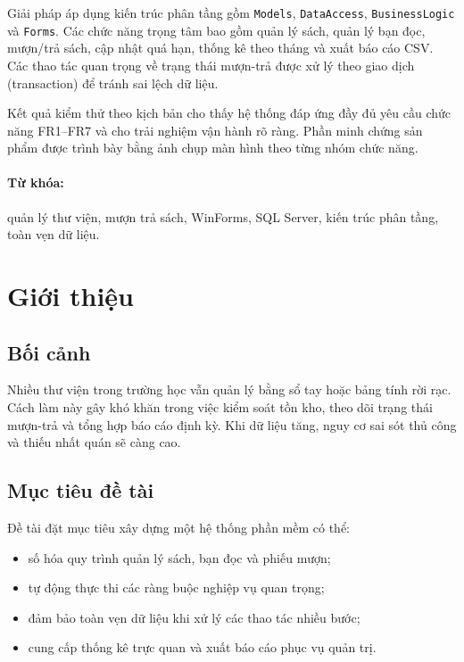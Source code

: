 \documentclass[12pt,a4paper]{article}
\begin{document}
Giải pháp áp dụng kiến trúc phân tầng gồm \texttt{Models}, \texttt{DataAccess}, \texttt{BusinessLogic} và \texttt{Forms}. Các chức năng trọng tâm bao gồm quản lý sách, quản lý bạn đọc, mượn/trả sách, cập nhật quá hạn, thống kê theo tháng và xuất báo cáo CSV. Các thao tác quan trọng về trạng thái mượn-trả được xử lý theo giao dịch (transaction) để tránh sai lệch dữ liệu.

Kết quả kiểm thử theo kịch bản cho thấy hệ thống đáp ứng đầy đủ yêu cầu chức năng FR1--FR7 và cho trải nghiệm vận hành rõ ràng. Phần minh chứng sản phẩm được trình bày bằng ảnh chụp màn hình theo từng nhóm chức năng.

\paragraph{Từ khóa:} quản lý thư viện, mượn trả sách, WinForms, SQL Server, kiến trúc phân tầng, toàn vẹn dữ liệu.

\newpage
\tableofcontents
\newpage
{}

\section{Giới thiệu}
\subsection{Bối cảnh}
Nhiều thư viện trong trường học vẫn quản lý bằng sổ tay hoặc bảng tính rời rạc. Cách làm này gây khó khăn trong việc kiểm soát tồn kho, theo dõi trạng thái mượn-trả và tổng hợp báo cáo định kỳ. Khi dữ liệu tăng, nguy cơ sai sót thủ công và thiếu nhất quán sẽ càng cao.

\subsection{Mục tiêu đề tài}
Đề tài đặt mục tiêu xây dựng một hệ thống phần mềm có thể:
\begin{itemize}[leftmargin=1.5cm]
    \item số hóa quy trình quản lý sách, bạn đọc và phiếu mượn;
    \item tự động thực thi các ràng buộc nghiệp vụ quan trọng;
    \item đảm bảo toàn vẹn dữ liệu khi xử lý các thao tác nhiều bước;
    \item cung cấp thống kê trực quan và xuất báo cáo phục vụ quản trị.
\end{itemize}
\end{document}
